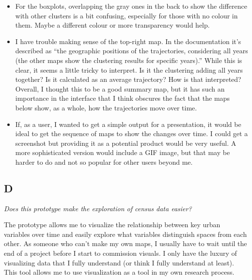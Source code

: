\documentclass[a4paper]{article}
\newcommand{\question}[1]{\smallskip\noindent\emph{#1}}
\newcommand{\censure}[1]{}
\begin{document}
\begin{itemize}
    \item{For the boxplots, overlapping the gray ones in the back to show the
            difference with other clusters is a bit confusing, especially for
            those with no colour in them. Maybe a different colour or more
            transparency would help. }

    \item{I have trouble making sense of the top-right map. In the documentation
            it’s described as “the geographic positions of the trajectories,
            considering all years (the other maps show the clustering results
            for specific years).” While this is clear, it seems a little tricky
            to interpret. Is it the clustering adding all years together? Is it
            calculated as an average trajectory? How is that interpreted?
            Overall, I thought this to be a good summary map, but it has such an
            importance in the interface that I think obscures the fact that the
            maps below show, as a whole, how the trajectories move over time.}

    \item{If, as a user, I wanted to get a simple output for a presentation, it
            would be ideal to get the sequence of maps to show the changes over
            time. I could get a screenshot but providing it as a potential
            product would be very useful. A more sophisticated version would
            include a GIF image, but that may be harder to do and not so popular
            for other users beyond me.}
\end{itemize}


\subsection{D\censure{ - Patrick Adler}}
\censure{\emph{Research Associate at the Martin Prosperity Institute, Canada.}}

\question{Does this prototype make the exploration of census data easier?}

The prototype allows me to visualize the relationship between key urban
variables over time and easily explore  what variables distinguish spaces from
each other. As someone who can’t make my own maps, I usually have to wait until
the end of a project before I start to commission visuals. I only have the
luxury of visualizing data that I fully understand (or think I fully understand
at least).  This tool allows me to use visualization as a tool in my own
research process.  
\end{document}
